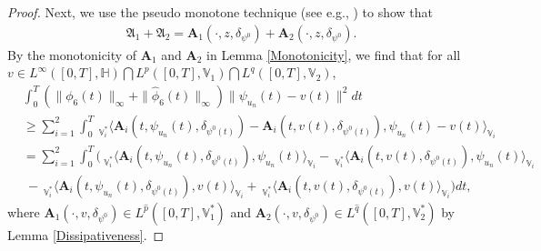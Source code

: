 \documentclass[11pt]{article}
\renewcommand{\geq}{\geqslant}  %
\numberwithin{equation}{section}
\begin{document}
\begin{proof}
Next, we use the pseudo monotone technique (see e.g., \cite{Zeidler}) to show that
\begin{align}&\label{weak23a}
\mathfrak{A}_1+\mathfrak{A}_2=
\mathbf{A}_1(\cdot,z,
\delta_{\psi^0})+\mathbf{A}_2(\cdot,z,
\delta_{\psi^0}).
\end{align}
By the monotonicity of $\mathbf{A}_1$ and $\mathbf{A}_2$ in Lemma \ref{Monotonicity}, we find that for all $v\in
 L^\infty ([0,T], \mathbb{H} )\bigcap
 L^p([0,T], \mathbb{V}_1  )\bigcap L^q([0,T], \mathbb{V}_2  )$,
\begin{align}\label{weak20}
&
\int_0^T
(\| \phi_6(t)\|_\infty +
\| \widehat{\phi} _6(t)\|_\infty
) \| \psi_{u_n}(t)-v(t)\|^2 dt
\nonumber\\
&
\geq\sum_{i=1}^2\int_0^T\ _{\mathbb{V}_i^*}\big\langle \mathbf{A}_i(t,\psi_{u_n}(t),\delta_{\psi^0(t)})
-\mathbf{A}_i(t,v(t),\delta_{\psi^0(t)})
,
\psi_{u_n}(t)-v(t)\big  \rangle_{\mathbb{V}_i}
\nonumber\\&=
\sum_{i=1}^2\int_0^T\bigg(
\ _{\mathbb{V}_i^*}\big\langle \mathbf{A}_i(t,\psi_{u_n}(t),\delta_{\psi^0(t)}),
\psi_{u_n}(t)\big  \rangle_{\mathbb{V}_i} -
\ _{\mathbb{V}_i^*}\big\langle \mathbf{A}_i(t,v(t),
\delta_{\psi^0(t)}),
\psi_{u_n}(t)\big  \rangle_{\mathbb{V}_i}
\nonumber\\&\ - \ _{\mathbb{V}_i^*}\big\langle
\mathbf{A}_i(t,\psi_{u_n}(t),
\delta_{\psi^0(t)}),
v(t)\big  \rangle_{\mathbb{V}_i}
+\ _{\mathbb{V}_i^*}\big\langle
\mathbf{A}_i(t,v(t),
\delta_{\psi^0(t)}),
v(t)\big  \rangle_{\mathbb{V}_i}\bigg)dt,
\end{align}
where
$\mathbf{A}_1(\cdot,v,\delta_{\psi^0})
\in L^{\widehat{p}}([0,T], \mathbb{V}^*_1  )$ and
$\mathbf{A}_2(\cdot,v,\delta_{\psi^0})
\in L^{\widehat{q}}([0,T], \mathbb{V}^*_2  )$ by Lemma \ref{Dissipativeness}.



\end{proof}
\end{document}
